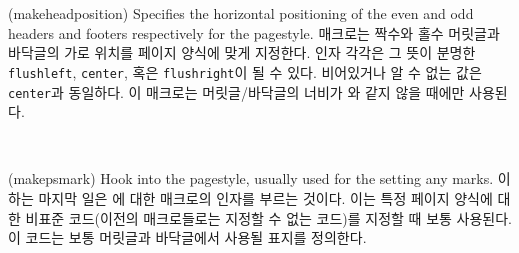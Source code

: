 \begin{syntax}
\cmd{\makeheadposition}\\
     \\
\end{syntax}
\glossary(makeheadposition)%
  {}%
  {Specifies the horizontal positioning of the even and odd headers and
   footers respectively for the  pagestyle.}
 매크로는 짝수와 홀수 머릿글과
바닥글의 가로 위치를  페이지 양식에 맞게
지정한다.
 인자 각각은 그 뜻이 분명한 \texttt{flushleft}, \texttt{center},
혹은 \texttt{flushright}이 될 수 있다.
비어있거나 알 수 없는 값은 \texttt{center}과 동일하다.
이 매크로는 머릿글/바닥글의 너비가
와 같지 않을 때에만 사용된다.

\begin{syntax}
\cmd{\makepsmarks} \\
\end{syntax}
\glossary(makepsmark)
  {}%
  {Hook into the  pagestyle, usually used for the 
   setting any marks.}
\cmd{\pagestyle}이 하는 마지막 일은 에 대한
\cmd{\makepsmarks} 매크로의  인자를 부르는 것이다.
이는 특정 페이지 양식에 대한 비표준
코드(이전의 매크로들로는 지정할 수 없는 코드)를 지정할 때 보통 사용된다.
이 코드는 보통 머릿글과 바닥글에서
사용될 표지를 정의한다.

